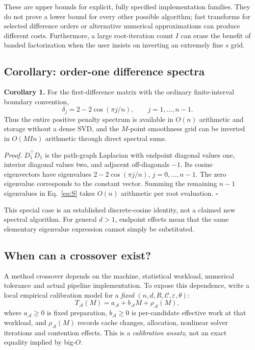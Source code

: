 These are upper bounds for explicit, fully specified
implementation families. They do not prove
a lower bound for every other possible algorithm;
fast transforms for selected difference orders
or alternative numerical approximations can
produce different costs. Furthermore, a large
root-iteration count $I$ can erase the benefit of
banded factorization when the user insists on
inverting an extremely fine $s$ grid.

\subsection{Corollary: order-one difference spectra}
\noindent\textbf{Corollary 1.}
For the first-difference matrix with the
ordinary finite-interval boundary convention,
\begin{equation}\label{eq:theory_dct}
\delta_j=2-2\cos(\pi j/n),\qquad j=1,\ldots,n-1.
\end{equation}
Thus the entire positive penalty spectrum
is available in $O(n)$ arithmetic and
storage without a dense SVD, and the
$M$-point smoothness grid can be inverted
in $O(MIn)$ arithmetic through direct
spectral sums.

\noindent\emph{Proof.}
$D_1^\top D_1$ is the path-graph
Laplacian with endpoint diagonal values
one, interior diagonal values two, and
adjacent off-diagonals $-1$. Its cosine
eigenvectors have eigenvalues
$2-2\cos(\pi j/n)$, $j=0,\ldots,n-1$.
The zero eigenvalue corresponds to the
constant vector. Summing the remaining
$n-1$ eigenvalues in Eq.~\eqref{eq:S}
takes $O(n)$ arithmetic per root evaluation.
\hfill$\square$

This special case is an established discrete-cosine
identity, not a claimed new spectral algorithm.
For general $d>1$, endpoint effects mean that
the same elementary eigenvalue expression
cannot simply be substituted.

\subsection{When can a crossover exist?}
\label{sec:crossover}
A method crossover depends on the machine,
statistical workload, numerical tolerance and
actual pipeline implementation. To expose
this dependence, write a local empirical
calibration model for a \emph{fixed}
$(n,d,R,\mathcal C,\varepsilon,\theta)$:
\begin{equation}\label{eq:theory_affine_time}
T_{\mathcal A}(M)=a_{\mathcal A}
+b_{\mathcal A}M+\rho_{\mathcal A}(M),
\end{equation}
where $a_{\mathcal A}\ge0$ is fixed preparation,
$b_{\mathcal A}\ge0$ is per-candidate effective
work at that workload, and
$\rho_{\mathcal A}(M)$ records cache changes,
allocation, nonlinear solver iterations
and contention effects. This is a
\emph{calibration ansatz}, not an
exact equality implied by big-$O$.


